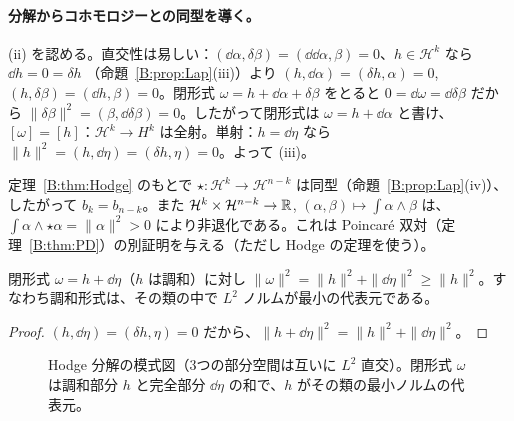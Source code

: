 \paragraph{分解からコホモロジーとの同型を導く。}(ii) を認める。直交性は易しい：$(\dd\alpha,\delta\beta)=(\dd\dd\alpha,\beta)=0$、$h\in\mathcal H^k$ なら $\dd h=0=\delta h$ （命題~\ref{B:prop:Lap}(iii)）より $(h,\dd\alpha)=(\delta h,\alpha)=0$, $(h,\delta\beta)=(\dd h,\beta)=0$。閉形式 $\omega=h+\dd\alpha+\delta\beta$ をとると $0=\dd\omega=\dd\delta\beta$ だから $\|\delta\beta\|^2=(\beta,\dd\delta\beta)=0$。したがって閉形式は $\omega=h+\dd\alpha$ と書け、$[\omega]=[h]$：$\mathcal H^k\to H^k$ は全射。単射：$h=\dd\eta$ なら $\|h\|^2=(h,\dd\eta)=(\delta h,\eta)=0$。よって (iii)。

\begin{cor}\label{B:cor:HodgePD}\tP
定理~\ref{B:thm:Hodge} のもとで $\star:\mathcal H^k\to\mathcal H^{n-k}$ は同型（命題~\ref{B:prop:Lap}(iv)）、したがって $b_k=b_{n-k}$。また $\mathcal H^k\times\mathcal H^{n-k}\to\mathbb R$, $(\alpha,\beta)\mapsto\int\alpha\wedge\beta$ は、$\int\alpha\wedge\star\alpha=\|\alpha\|^2>0$ により非退化である。これは Poincaré 双対（定理~\ref{B:thm:PD}）の別証明を与える（ただし Hodge の定理を使う）。
\end{cor}

\begin{cor}[調和形式の最小性]\label{B:cor:minim}\tP
閉形式 $\omega=h+\dd\eta$（$h$ は調和）に対し $\|\omega\|^2=\|h\|^2+\|\dd\eta\|^2\ge\|h\|^2$。すなわち調和形式は、その類の中で $L^2$ ノルムが最小の代表元である。
\end{cor}
\begin{proof}
$(h,\dd\eta)=(\delta h,\eta)=0$ だから、$\|h+\dd\eta\|^2=\|h\|^2+\|\dd\eta\|^2$。
\end{proof}

\begin{figure}[ht]
\centering
{}
\caption{Hodge 分解の模式図（3つの部分空間は互いに $L^2$ 直交）。閉形式 $\omega$ は調和部分 $h$ と完全部分 $\dd\eta$ の和で、$h$ がその類の最小ノルムの代表元。}\label{B:fig:HodgeDec}
\end{figure}

